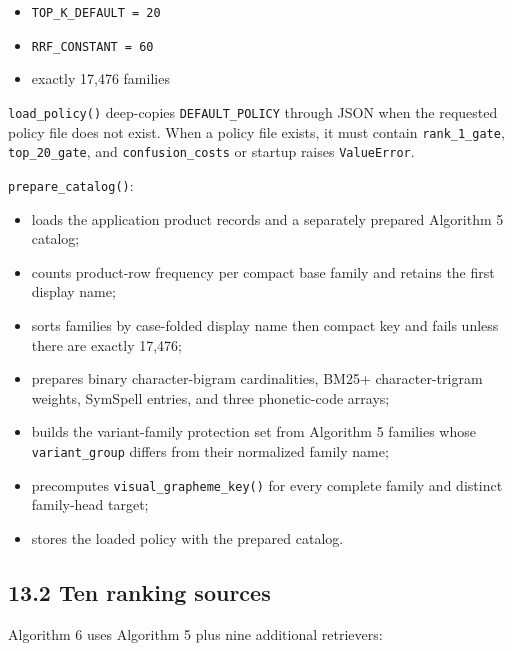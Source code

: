 \begin{itemize}
\tightlist
\item
  \texttt{TOP\_\allowbreak{}K\_\allowbreak{}DEFAULT\ =\ 20}
\item
  \texttt{RRF\_\allowbreak{}CONSTANT\ =\ 60}
\item
  exactly 17,476 families
\end{itemize}

\texttt{load\_\allowbreak{}policy()} deep-copies \texttt{DEFAULT\_\allowbreak{}POLICY} through JSON when the requested policy file does not exist. When a policy file exists, it must contain \texttt{rank\_\allowbreak{}1\_\allowbreak{}gate}, \texttt{top\_\allowbreak{}20\_\allowbreak{}gate}, and \texttt{confusion\_\allowbreak{}costs} or startup raises \texttt{ValueError}.

\texttt{prepare\_\allowbreak{}catalog()}:

\begin{itemize}
\tightlist
\item
  loads the application product records and a separately prepared Algorithm 5 catalog;
\item
  counts product-row frequency per compact base family and retains the first display name;
\item
  sorts families by case-folded display name then compact key and fails unless there are exactly 17,476;
\item
  prepares binary character-bigram cardinalities, BM25+ character-trigram weights, SymSpell entries, and three phonetic-code arrays;
\item
  builds the variant-family protection set from Algorithm 5 families whose \texttt{variant\_\allowbreak{}group} differs from their normalized family name;
\item
  precomputes \texttt{visual\_\allowbreak{}grapheme\_\allowbreak{}key()} for every complete family and distinct family-head target;
\item
  stores the loaded policy with the prepared catalog.
\end{itemize}

\subsection{13.2 Ten ranking sources}\label{132-ten-ranking-sources}

Algorithm 6 uses Algorithm 5 plus nine additional retrievers:

